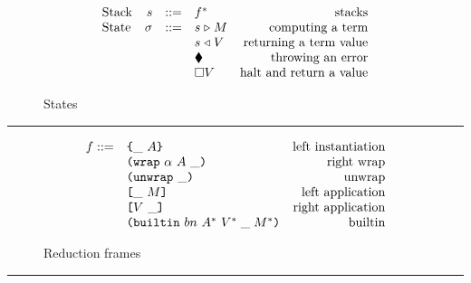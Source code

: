 \begin{figure*}[!ht]
\caption{The CK machine}\label{fig:ck-machine}
\centering
\begin{subfigure}[c]{\linewidth}  %
{\small
\caption{States}
    \[\begin{array}{lrclr}
        \textrm{Stack} & s      & ::= & f^*                               & \textrm{stacks}\\
        \textrm{State} & \sigma & ::= & s \mathrel\triangleright M                  & \textrm{computing a term}\\
                       &        &     & s \mathrel\triangleleft V                 & \textrm{returning a term value}\\
                       &        &     & \blacklozenge{}                        & \textrm{throwing an error}\\
                       &        &     & \square V                        & \textrm{halt and return a value}


    \end{array}\]
}
\end{subfigure}

\vspace{3mm}
\hrule
\vspace{3mm}

\begin{subfigure}[c]{\linewidth}      %
{\small
\caption{Reduction frames}
\[
    \begin{array}{rlr}
      f ::= & \texttt{\{}\_ ~ A\texttt{\}}                     & \textrm{left instantiation}\\
            & \texttt{(} \texttt{wrap} ~ \alpha ~ A ~ \_ \texttt{)}            & \textrm{right wrap}\\
            & \texttt{(} \texttt{unwrap} ~ \_ \texttt{)}{}                        & \textrm{unwrap}\\
            & \texttt{[} \_ ~ M \texttt{]}                      & \textrm{left application}\\
            & \texttt{[} V ~ \_ \texttt{]}                     & \textrm{right application}\\
            & \texttt{(} \texttt{builtin} ~ bn ~ A^* ~ V^*\; \_\; M^* \texttt{)}        & \textrm{builtin}\\
    \end{array}
\]
}
\end{subfigure}
\vspace{3mm}
\hrule
\vspace{3mm}


\end{figure*}

